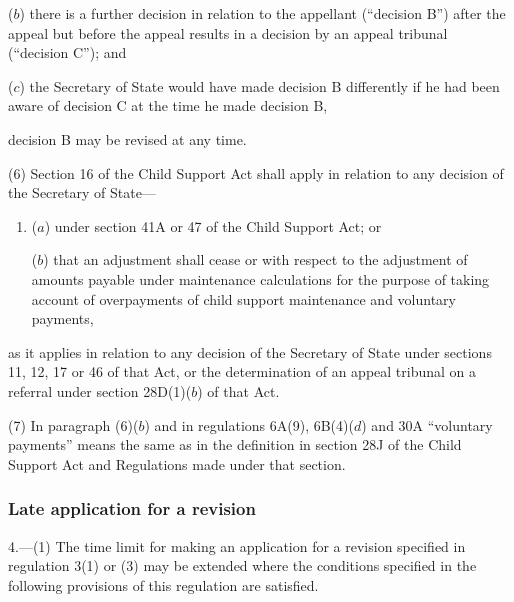 \documentclass[12pt,a4paper]{article}
\begin{document}
{\begin{enumerate}
($b$) there is a further decision in relation to the appellant (“decision B”) after the appeal but before the appeal results in a decision by an appeal tribunal (“decision C”); and

($c$) the Secretary of State would have made decision B differently if he had been aware of decision C at the time he made decision B,
\end{enumerate}
decision B may be revised at any time.

(6) Section 16 of the Child Support Act shall apply in relation to any decision of the Secretary of State—
\begin{enumerate}\item[]
($a$) under section 41A or 47 of the Child Support Act; or

($b$) that an adjustment shall cease or with respect to the adjustment of amounts payable under maintenance calculations for the purpose of taking account of overpayments of child support maintenance and voluntary payments,
\end{enumerate}
as it applies in relation to any decision of the Secretary of State under sections 11, 12, 17 or 46 of that Act, or the determination of an appeal tribunal on a referral under section 28D(1)($b$)  of that Act.

(7) In paragraph (6)($b$)  and in regulations 6A(9), 6B(4)($d$)  and 30A “voluntary payments” means the same as in the definition in section 28J of the Child Support Act and Regulations made under that section.

}

\subsubsection[4. Late application for a revision]{Late application for a revision}

4.—(1) The time limit for making an application for a revision specified in regulation 3(1) or (3) 
%
may be extended where the conditions specified in the following provisions of this regulation are satisfied.
\end{document}
